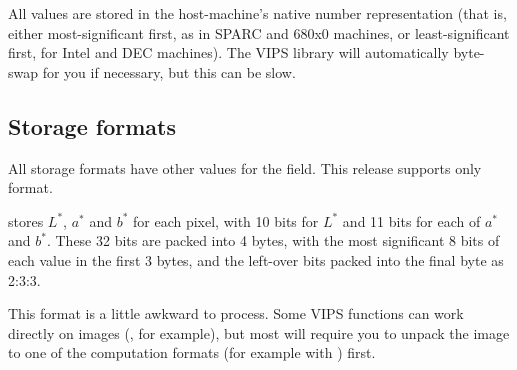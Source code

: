 All values are stored in the host-machine's native number representation (that
is, either most-significant first, as in SPARC and 680x0 machines, or
least-significant first, for Intel and DEC machines). The VIPS library will 
automatically byte-swap for you if necessary, but this can be slow.

\subsection{Storage formats}

All storage formats have other values for the  field. This
release supports only  format. 

 stores $L^{*}$, $a^{*}$ and $b^{*}$ for each pixel,
with 10 bits for $L^{*}$ and 11 bits for each of $a^{*}$ and $b^{*}$. These
32 bits are packed into 4 bytes, with the most significant 8 bits of each
value in the first 3 bytes, and the left-over bits packed into the final
byte as 2:3:3.

This format is a little awkward to process. Some VIPS functions can work
directly on  images (, for example),
but most will require you to unpack the image to one of the computation
formats (for example with ) first.
